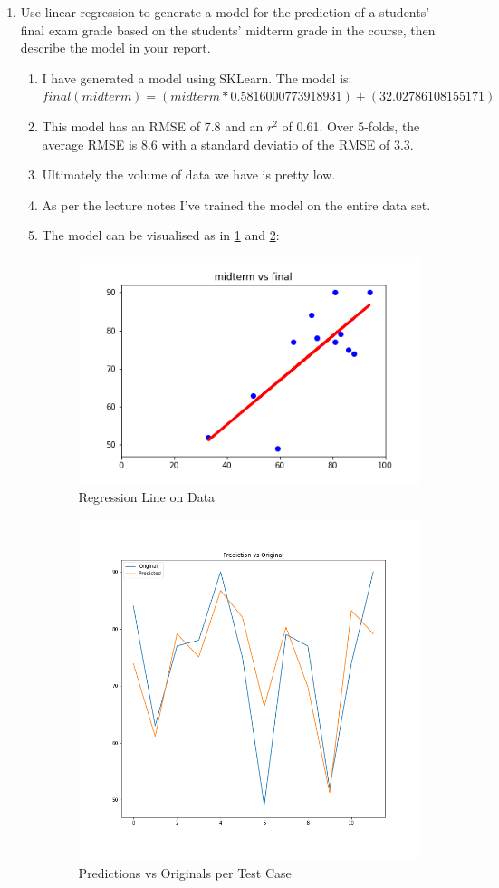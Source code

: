 \documentclass{scrreprt}
\begin{document}
\begin{enumerate}
\begin{itemize}
	\end{itemize}

\pagebreak
	\item Use linear regression to generate a model for the prediction of a students’ final exam grade based on the students’ midterm grade in the course, then describe the model in your report.
	\begin{enumerate}
		\item I have generated a model using SKLearn. The model is:\\
		$final(midterm) = 
		(midterm * 0.5816000773918931) + (32.02786108155171)$
		\item This model has an RMSE of 7.8 and an $r^2$ of 0.61. Over 5-folds, the average RMSE is 8.6 with a standard deviatio of the RMSE of 3.3.
		\item Ultimately the volume of data we have is pretty low. 
		\item As per the lecture notes I've trained the model on the entire data set.
		\item The model can be visualised as in \ref{data} and \ref{q1c}:
		
				\begin{figure}[h!]
			\centering
			\includegraphics[width=0.5\linewidth]{Data with Regression.png}
			\caption{Regression Line on Data}\label{data}
		\end{figure}
		
		\begin{figure}[h!]
			\centering
			\includegraphics[width=0.5\linewidth]{linear_prediction_vs_original.png}
			\caption{Predictions vs Originals per Test Case}\label{q1c}
		\end{figure}
		

\end{enumerate}
\end{enumerate}
\end{document}
